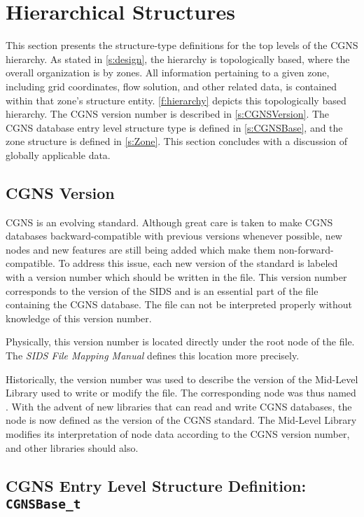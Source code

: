 \section{Hierarchical Structures}
\label{s:topo}
\thispagestyle{plain}

This section presents the structure-type definitions for the top levels
of the CGNS hierarchy.
As stated in \autoref{s:design}, the hierarchy is topologically
based, where the overall organization is by zones.
All information pertaining to a given zone, including grid coordinates,
flow solution, and other related data, is contained within that zone's
structure entity.
\autoref{f:hierarchy} depicts this topologically based hierarchy.
The CGNS version number is described in \autoref{s:CGNSVersion}.
The CGNS database entry level structure type is defined in
\autoref{s:CGNSBase}, and the zone structure is defined in
\autoref{s:Zone}.
This section concludes with a discussion of globally applicable data.

\subsection{CGNS Version}
\label{s:CGNSVersion}

CGNS is an evolving standard.
Although great care is taken to make CGNS databases backward-compatible
with previous versions whenever possible, new nodes and new features are
still being added which make them non-forward-compatible.
To address this issue, each new version of the standard is labeled with
a version number which should be written in the file.
This version number corresponds to the version of the SIDS and is an
essential part of the file containing the CGNS database.
The file can not be interpreted properly without knowledge of this
version number.

Physically, this version number is located directly under the root node
of the file.
The \textit{SIDS File Mapping
Manual} defines this location more precisely.

Historically, the version number was used to describe the version of the
Mid-Level Library used to write or modify the file.
The corresponding node was thus named .
With the advent of new libraries that can read and write CGNS databases,
the node is now defined as the version of the CGNS standard.
The Mid-Level Library modifies its interpretation of node data according
to the CGNS version number, and other libraries should also.

\subsection{CGNS Entry Level Structure Definition: \texttt{CGNSBase\_t}}
\label{s:CGNSBase}

